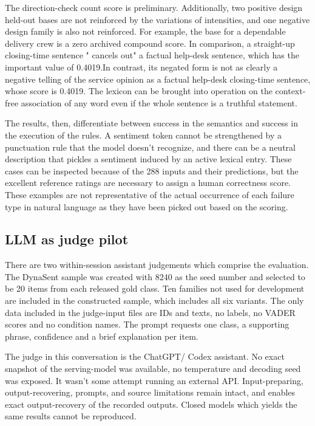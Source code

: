\documentclass[11pt]{article}
\begin{document}
The direction-check count score is preliminary. Additionally, two positive design held-out bases are not reinforced by the variations of intensities, and one negative design family is also not reinforced. For example, the base for a dependable delivery crew is a zero archived compound score. In comparison, a straight-up closing-time sentence " cancels out" a factual help-desk sentence, which has the important value of 0.4019.In contrast, its negated form is not as clearly a negative telling of the service opinion as a factual help-desk closing-time sentence, whose score is 0.4019. The lexicon can be brought into operation on the context-free association of any word even if the whole sentence is a truthful statement.




The results, then, differentiate between success in the semantics and success in the execution of the rules. A sentiment token cannot be strengthened by a punctuation rule that the model doesn't recognize, and there can be a neutral description that pickles a sentiment induced by an active lexical entry. These cases can be inspected because of the 288 inputs and their predictions, but the excellent reference ratings are necessary to assign a human correctness score. These examples are not representative of the actual occurrence of each failure type in natural language as they have been picked out based on the scoring.


\subsection{LLM as judge pilot}

There are two within-session assistant judgements which comprise the evaluation. The DynaSent sample was created with 8240 as the seed number and selected to be 20 items from each released gold class. Ten families not used for development are included in the constructed sample, which includes all six variants. The only data included in the judge-input files are IDs and texts, no labels, no VADER scores and no condition names. The prompt requests one class, a supporting phrase, confidence and a brief explanation per item.


The judge in this conversation is the ChatGPT/ Codex assistant. No exact snapshot of the serving-model was available, no temperature and decoding seed was exposed. It wasn't some attempt running an external API. Input-preparing, output-recovering, prompts, and source limitations remain intact, and enables exact output-recovery of the recorded outputs. Closed models which yields the same results cannot be reproduced.
\end{document}
